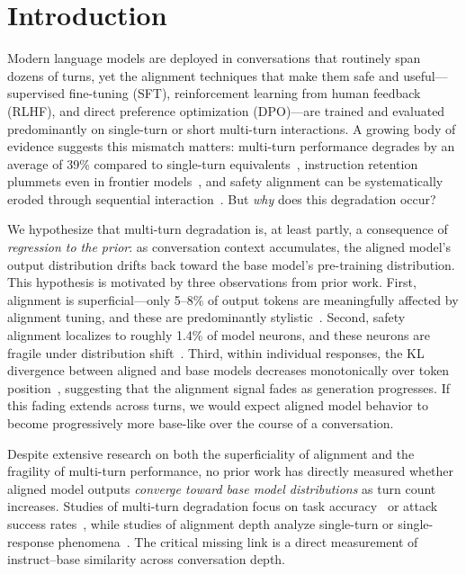 \section{Introduction}
\label{sec:intro}

Modern language models are deployed in conversations that routinely span dozens of turns, yet the alignment techniques that make them safe and useful---supervised fine-tuning (SFT), reinforcement learning from human feedback (RLHF), and direct preference optimization (DPO)---are trained and evaluated predominantly on single-turn or short multi-turn interactions. A growing body of evidence suggests this mismatch matters: multi-turn performance degrades by an average of 39\% compared to single-turn equivalents~\citep{laban2025lost}, instruction retention plummets even in frontier models~\citep{sirdeshmukh2025multichallenge}, and safety alignment can be systematically eroded through sequential interaction~\citep{li2026multiturn_jailbreak}. But \emph{why} does this degradation occur?

 We hypothesize that multi-turn degradation is, at least partly, a consequence of \emph{regression to the prior}: as conversation context accumulates, the aligned model's output distribution drifts back toward the base model's pre-training distribution. This hypothesis is motivated by three observations from prior work. First, alignment is superficial---only 5--8\% of output tokens are meaningfully affected by alignment tuning, and these are predominantly stylistic~\citep{lin2024urial}. Second, safety alignment localizes to roughly 1.4\% of model neurons, and these neurons are fragile under distribution shift~\citep{li2024ssah}. Third, within individual responses, the KL divergence between aligned and base models decreases monotonically over token position~\citep{lin2024urial}, suggesting that the alignment signal fades as generation progresses. If this fading extends across turns, we would expect aligned model behavior to become progressively more base-like over the course of a conversation.

 Despite extensive research on both the superficiality of alignment and the fragility of multi-turn performance, no prior work has directly measured whether aligned model outputs \emph{converge toward base model distributions} as turn count increases. Studies of multi-turn degradation focus on task accuracy~\citep{laban2025lost, myung2026conversational} or attack success rates~\citep{li2026multiturn_jailbreak}, while studies of alignment depth analyze single-turn or single-response phenomena~\citep{lin2024urial, li2024ssah, vergara2026superficial}. The critical missing link is a direct measurement of instruct--base similarity across conversation depth.

